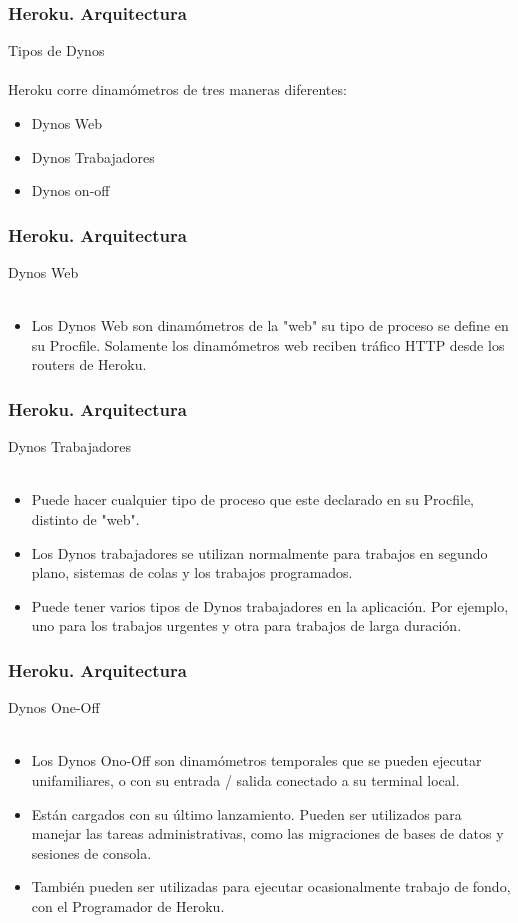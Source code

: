 \documentclass{beamer}
\begin{document}
\begin{frame}
	\frametitle{Heroku. Arquitectura}
	\centering Tipos de Dynos\\ \ \\
	Heroku corre dinamómetros de tres maneras diferentes: 
	\begin{itemize}
		\item Dynos Web
		\item Dynos Trabajadores
		\item Dynos on-off
	\end{itemize}
\end{frame}
\begin{frame}
	\frametitle{Heroku. Arquitectura}
	\centering Dynos Web\\ \ \\
	\begin{itemize}
		\item Los Dynos Web son dinamómetros de la "web" su tipo de proceso se define en su Procfile. Solamente los dinamómetros web reciben tráfico HTTP desde los routers de Heroku. 
	\end{itemize}
	
\end{frame}
\begin{frame}
	\frametitle{Heroku. Arquitectura}
	\centering Dynos Trabajadores\\ \ \\
	\begin{itemize}
		\item Puede hacer cualquier tipo de proceso que este declarado en su Procfile, distinto de "web". 
		\item Los Dynos trabajadores se utilizan normalmente para trabajos en segundo plano, sistemas de colas y los trabajos programados. 
		\item Puede tener varios tipos de Dynos trabajadores en la aplicación. Por ejemplo, uno para los trabajos urgentes y otra para trabajos de larga duración.
	\end{itemize}
\end{frame}
\begin{frame}
	\frametitle{Heroku. Arquitectura}
	\centering Dynos One-Off \\ \ \\
	\begin{itemize}
		\item Los Dynos Ono-Off son dinamómetros temporales que se pueden ejecutar unifamiliares, o con su entrada / salida conectado a su terminal local.
		\item Están cargados con su último lanzamiento. Pueden ser utilizados para manejar las tareas administrativas, como las migraciones de bases de datos y sesiones de consola. 
		\item También pueden ser utilizadas para ejecutar ocasionalmente trabajo de fondo, con el Programador de Heroku.  
	\end{itemize}
\end{frame}
\end{document}
